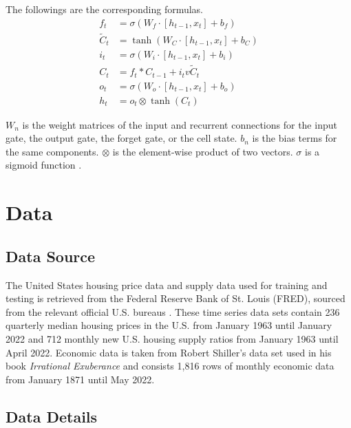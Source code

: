 \documentclass [MS] {uclathes}
\begin{document}
The followings are the corresponding formulas.
$$
\begin{aligned}
f_{t} &=\sigma\left(W_{f} \cdot\left[h_{t-1}, x_{t}\right]+b_{f}\right) \\
\tilde{C}_{t} &=\tanh \left(W_{C} \cdot\left[h_{t-1}, x_{t}\right]+b_{C}\right) \\
i_{t} &=\sigma\left(W_{i} \cdot\left[h_{t-1}, x_{t}\right]+b_{i}\right) \\
C_{t} &=f_{t} * C_{t-1}+i_{t} v \tilde{C}_{t} \\
o_{t} &=\sigma\left(W_{o} \cdot\left[h_{t-1}, x_{t}\right]+b_{o}\right) \\
h_{t} &=o_{t} \otimes \tanh \left(C_{t}\right)
\end{aligned}
$$

$W_n$ is the weight matrices of the input and recurrent connections for the input gate, the output gate, the forget gate, or the cell state. $b_n$ is the bias terms for the same components. $\otimes$ is the element-wise product of two vectors. $\sigma$ is a sigmoid function \cite{fager_wil_chew_2019}.


\chapter{Data}
\section{Data Source}
The United States housing price data and supply data used for training and testing is retrieved from the Federal Reserve Bank of St. Louis (FRED), sourced from the relevant official U.S. bureaus \cite{us_census_bureau_median_1963}\cite{us_census_bureau_monthly_1963}. These time series data sets contain 236 quarterly median housing prices in the U.S. from January 1963 until January 2022 and 712 monthly new U.S. housing supply ratios from January 1963 until April 2022. Economic data is taken from Robert Shiller's data set used in his book \textit{Irrational Exuberance}\cite{online_data_robert_shiller} and consists 1,816 rows of monthly economic data from January 1871 until May 2022.

\section{Data Details}
\end{document}
